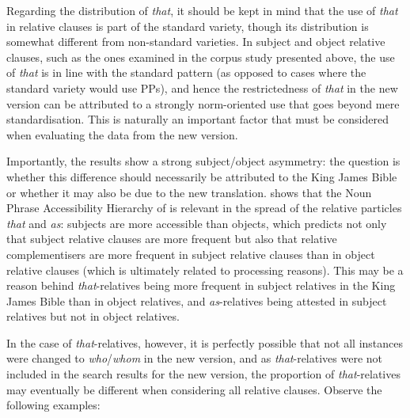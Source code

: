 Regarding the distribution of \textit{that}, it should be kept in mind that the use of \textit{that} in relative clauses is part of the standard variety, though its distribution is somewhat different from non-standard varieties. In subject and object relative clauses, such as the ones examined in the corpus study presented above, the use of \textit{that} is in line with the standard pattern (as opposed to cases where the standard variety would use PPs), and hence the restrictedness of \textit{that} in the new version can be attributed to a strongly norm-oriented use that goes beyond mere standardisation. This is naturally an important factor that must be considered when evaluating the data from the new version. 

Importantly, the results show a strong subject/object asymmetry: the question is whether this difference should necessarily be attributed to the King James Bible or whether it may also be due to the new translation. \citet[48--59]{herrmann2005} shows that the Noun Phrase Accessibility Hierarchy of \citet[66--67]{keenancomrie1977} is relevant in the spread of the relative particles \textit{that} and \textit{as}: subjects are more accessible than objects, which predicts not only that subject relative clauses are more frequent but also that relative complementisers are more frequent in subject relative clauses than in object relative clauses (which is ultimately related to processing reasons). This may be a reason behind \textit{that}-relatives being more frequent in subject relatives in the King James Bible than in object relatives, and \textit{as}-relatives being attested in subject relatives but not in object relatives.

In the case of \textit{that}-relatives, however, it is perfectly possible that not all instances were changed to \textit{who}/\textit{whom} in the new version, and as \textit{that}-relatives were not included in the search results for the new version, the proportion of \textit{that}-relatives may eventually be different when considering all relative clauses. Observe the following examples:\largerpage

